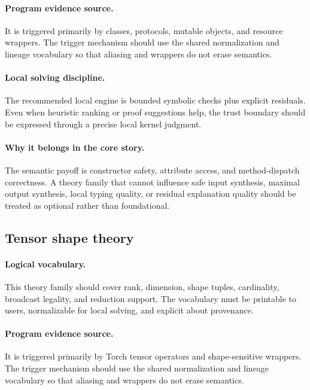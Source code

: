 \documentclass[11pt]{report}
\theoremstyle{definition}
\theoremstyle{plain}
\begin{document}
\paragraph{Program evidence source.}
It is triggered primarily by classes, protocols, mutable objects, and resource wrappers. The trigger mechanism should use the
shared normalization and lineage vocabulary so that aliasing and wrappers do
not erase semantics.

\paragraph{Local solving discipline.}
The recommended local engine is bounded symbolic checks plus explicit residuals. Even when heuristic ranking or
proof suggestions help, the trust boundary should be expressed through a
precise local kernel judgment.

\paragraph{Why it belongs in the core story.}
The semantic payoff is constructor safety, attribute access, and method-dispatch correctness. A theory family that cannot influence safe
input synthesis, maximal output synthesis, local typing quality, or residual
explanation quality should be treated as optional rather than foundational.

\subsection{Tensor shape theory}

\paragraph{Logical vocabulary.}
This theory family should cover rank, dimension, shape tuples, cardinality, broadcast legality, and reduction support. The vocabulary must be printable to
users, normalizable for local solving, and explicit about provenance.

\paragraph{Program evidence source.}
It is triggered primarily by Torch tensor operators and shape-sensitive wrappers. The trigger mechanism should use the
shared normalization and lineage vocabulary so that aliasing and wrappers do
not erase semantics.
\end{document}
